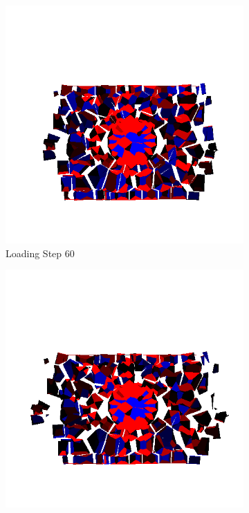 \begin{figure}[ht!]
    \begin{subfigure}{.33\textwidth}
      \centering
      \includegraphics[width=1.0\linewidth]{Files/Small_DEF/IS2/DEP5-STEP(080).png}
      \caption{Loading Step 60}
    \end{subfigure}%
    \begin{subfigure}{.33\textwidth}
      \centering
      \includegraphics[width=1.0\linewidth]{Files/Small_DEF/IS2/DEP5-STEP(100).png}

\end{subfigure}
\end{figure}
